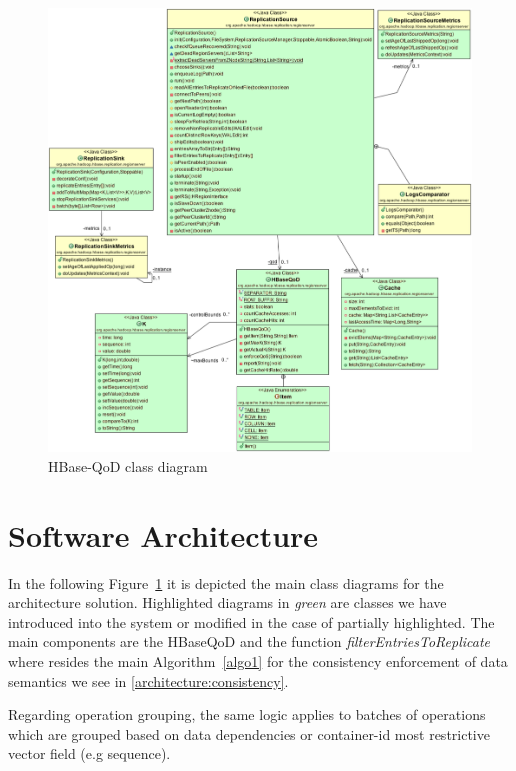 \begin{figure}
\centering
\includegraphics[width=1.0\linewidth]{figs/HBaseQoD-class-diagram.pdf}
\caption{HBase-QoD class diagram}
\label{fig-class-diagram}
\end{figure}



\section{Software Architecture}
In the following Figure~\ref{fig-class-diagram} it is depicted the main class diagrams for the architecture solution. Highlighted diagrams in \emph{green} are classes we have introduced into the system or modified in the case of partially highlighted. The main components are the HBaseQoD and the function \emph{filterEntriesToReplicate} where resides the main Algorithm~\ref{algo1} for the consistency enforcement of data semantics we see in \ref{architecture:consistency}.


Regarding operation grouping, the same logic applies to batches of operations which are grouped based on data dependencies or container-id most restrictive vector field (e.g sequence).


